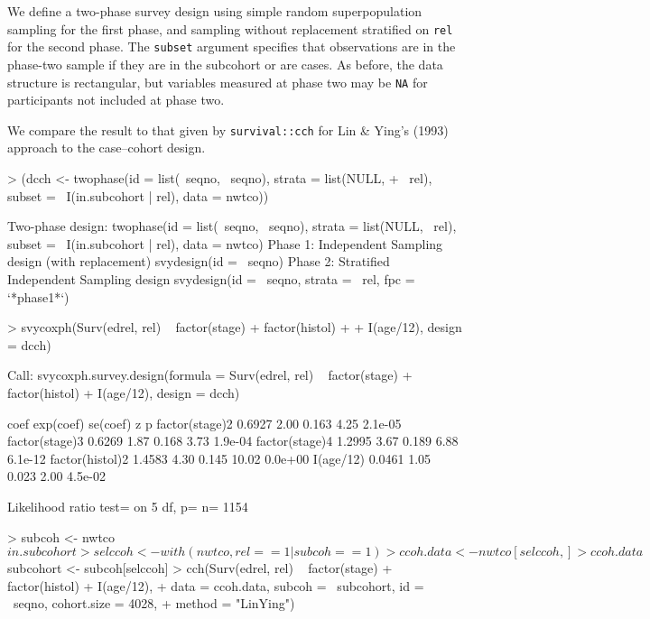 \documentclass{article}
\begin{document}
We define a two-phase survey design using simple random
superpopulation sampling for the first phase, and sampling without
replacement stratified on \texttt{rel} for the second phase. The
\texttt{subset} argument specifies that observations are in the phase-two sample if they are in the subcohort or are cases.  As before, the data structure is rectangular, but variables measured at phase two may be \texttt{NA} for participants not included at phase two.

We compare the result to that given by \texttt{survival::cch} for Lin
\& Ying's (1993) approach to the case--cohort design.


\begin{Schunk}
\begin{Sinput}
> (dcch <- twophase(id = list(~seqno, ~seqno), strata = list(NULL, 
+     ~rel), subset = ~I(in.subcohort | rel), data = nwtco))
\end{Sinput}
\begin{Soutput}
Two-phase design: twophase(id = list(~seqno, ~seqno), strata = list(NULL, ~rel), 
    subset = ~I(in.subcohort | rel), data = nwtco)
Phase 1:
Independent Sampling design (with replacement)
svydesign(id = ~seqno)
Phase 2:
Stratified Independent Sampling design
svydesign(id = ~seqno, strata = ~rel, fpc = `*phase1*`)
\end{Soutput}
\begin{Sinput}
> svycoxph(Surv(edrel, rel) ~ factor(stage) + factor(histol) + 
+     I(age/12), design = dcch)
\end{Sinput}
\begin{Soutput}
Call:
svycoxph.survey.design(formula = Surv(edrel, rel) ~ factor(stage) + 
    factor(histol) + I(age/12), design = dcch)


                  coef exp(coef) se(coef)     z       p
factor(stage)2  0.6927      2.00    0.163  4.25 2.1e-05
factor(stage)3  0.6269      1.87    0.168  3.73 1.9e-04
factor(stage)4  1.2995      3.67    0.189  6.88 6.1e-12
factor(histol)2 1.4583      4.30    0.145 10.02 0.0e+00
I(age/12)       0.0461      1.05    0.023  2.00 4.5e-02

Likelihood ratio test=  on 5 df, p=  n= 1154 
\end{Soutput}
\begin{Sinput}
> subcoh <- nwtco$in.subcohort
> selccoh <- with(nwtco, rel == 1 | subcoh == 1)
> ccoh.data <- nwtco[selccoh, ]
> ccoh.data$subcohort <- subcoh[selccoh]
> cch(Surv(edrel, rel) ~ factor(stage) + factor(histol) + I(age/12), 
+     data = ccoh.data, subcoh = ~subcohort, id = ~seqno, cohort.size = 4028, 
+     method = "LinYing")
\end{Sinput}
\end{Schunk}
\end{document}
